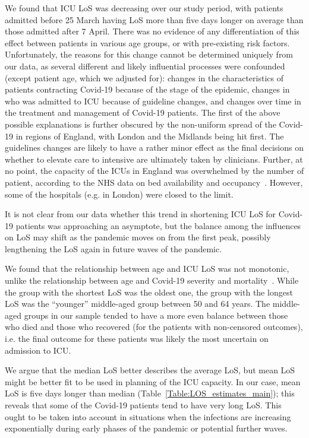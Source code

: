 \documentclass[review]{elsarticle}
\begin{document}
We found that ICU LoS was decreasing over our study period, with patients admitted before 25 March having LoS more than five days longer on average than those admitted after 7 April. There was no evidence of any differentiation of this effect between patients in various age groups, or with pre-existing risk factors. Unfortunately, the reasons for this change cannot be determined uniquely from our data, as several different and likely influential processes were confounded (except patient age, which we adjusted for): changes in the characteristics of patients contracting Covid-19 because of the stage of the epidemic, changes in who was admitted to ICU because of guideline changes, and changes over time in the treatment and management of Covid-19 patients. The first of the above possible explanations is further obscured by the non-uniform spread of the Covid-19 in regions of England, with London and the Midlands being hit first. The guidelines changes are likely to have a rather minor effect as the final decisions on whether to elevate care to intensive are ultimately taken by clinicians. Further, at no point, the capacity of the ICUs in England was overwhelmed by the number of patient, according to the NHS data on bed availability and occupancy~\cite{nhs2020}. However, some of the hospitals (e.g. in London) were closed to the limit.

It is not clear from our data whether this trend in shortening ICU LoS for Covid-19 patients was approaching an asymptote, but the balance among the influences on LoS may shift as the pandemic moves on from the first peak, possibly lengthening the LoS again in future waves of the pandemic.  

We found that the relationship between age and ICU LoS was not monotonic, unlike the relationship between age and Covid-19 severity and mortality~\cite{072020icnarc}. While the group with the shortest LoS was the oldest one, the group with the longest LoS was the “younger” middle-aged group between 50 and 64 years. The middle-aged groups in our sample tended to have a more even balance between those who died and those who recovered (for the patients with non-censored outcomes), i.e. the final outcome for these patients was likely the most uncertain on admission to ICU. 

We argue that the median LoS better describes the average LoS, but mean LoS might be better fit to be used in planning of the ICU capacity. In our case, mean LoS is five days longer than median (Table~\ref{Table:LOS_estimates_main}); this reveals that some of the Covid-19 patients tend to have very long LoS. This ought to be taken into account in situations when the infections are increasing exponentially during early phases of the pandemic or potential further waves. 
\end{document}

